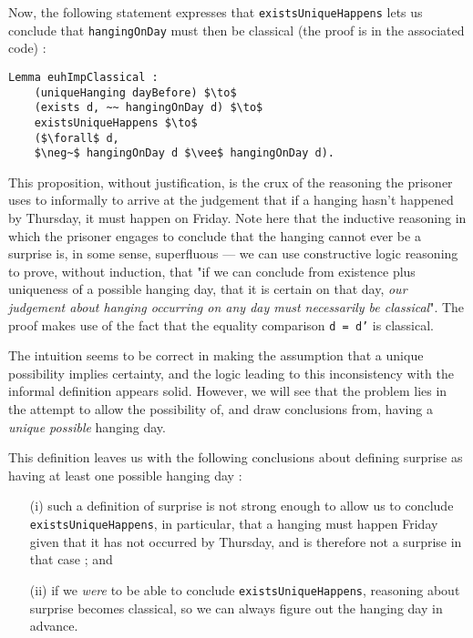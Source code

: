 \documentclass[journal]{journal}
\begin{document}
Now, the following statement expresses that {\tt existsUniqueHappens} lets us
conclude that {\tt hangingOnDay} must then be classical (the proof is in the
associated code) :

\begin{lstlisting}[mathescape=true]
  Lemma euhImpClassical :
    (uniqueHanging dayBefore) $\to$
    (exists d, ~~ hangingOnDay d) $\to$
    existsUniqueHappens $\to$
    ($\forall$ d,
    $\neg~$ hangingOnDay d $\vee$ hangingOnDay d).
\end{lstlisting}

This proposition, without justification, is the crux of the reasoning the prisoner
uses to informally to arrive at the judgement that
if a hanging hasn't happened by Thursday, it must happen on Friday.
Note here that the inductive reasoning in which the prisoner engages to conclude that the
hanging cannot ever be a surprise is, in some sense, superfluous --- we can use
constructive logic reasoning to prove, without induction, that "if we can conclude
from existence plus uniqueness of a possible hanging day, that it is certain on that day,
\emph{our judgement about hanging occurring on any day must necessarily be classical}".
The proof makes use of the fact that the equality comparison {\tt d = d'} is
classical.

The intuition seems to be correct in making the assumption that a unique possibility
implies certainty, and the logic leading to this inconsistency with the informal
definition appears solid.
However, we will see that the problem lies in the attempt
to allow the possibility of, and draw conclusions from, having a \emph{unique possible }
hanging day.

This definition leaves us with the following conclusions about defining surprise as
having at least one possible hanging day :

\begin{itemize}
  \item[(i)] such a definition of surprise is not strong enough to allow us to conclude
  {\tt existsUniqueHappens}, in particular, that a hanging
  must happen Friday given that it has not occurred by Thursday, and is
  therefore not a surprise in that case ; and \newline
  \item[(ii)] if we \emph{were} to be able to conclude {\tt existsUniqueHappens},
  reasoning about surprise
  becomes classical, so we can always figure out the hanging day in advance.
\end{itemize}
\end{document}
